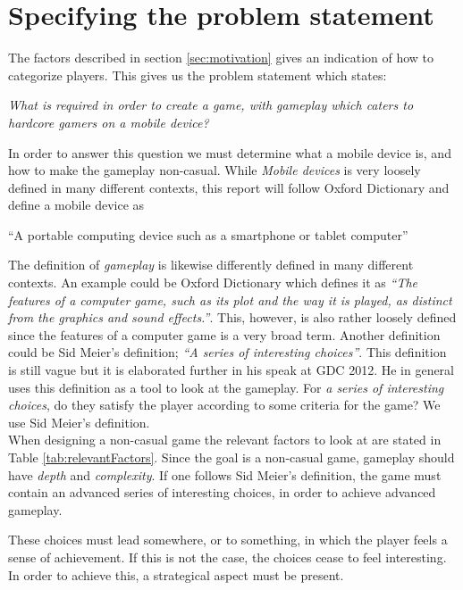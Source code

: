 \section{Specifying the problem statement}
\label{sec:specifyingtheproblemstatemen}

The factors described in section \ref{sec:motivation} gives an indication of how to categorize players.
This gives us the problem statement which states:
\begin{center}
\textit{What is required in order to create a game, with gameplay which caters to hardcore gamers on a mobile device?}
\end{center}

In order to answer this question we must determine what a mobile device is, and how to make the gameplay non-casual.
While \textit{Mobile devices} is very loosely defined in many different contexts, this report will follow Oxford Dictionary and define a mobile device as 
\begin{center}
``A portable computing device such as a smartphone or tablet computer''\cite{mobileOx}
\end{center}

The definition of \textit{gameplay} is likewise differently defined in many different contexts. 
An example could be Oxford Dictionary which defines it as \textit{``The features of a computer game, such as its plot and the way it is played, as distinct from the graphics and sound effects.''}\cite{gameplayOx}. This, however, is also rather loosely defined since the features of a computer game is a very broad term. 
Another definition could be Sid Meier's definition; \textit{``A series of interesting choices''}\cite{GDC2012}. 
This definition is still vague but it is elaborated further in his speak at GDC 2012.\cite{GDC2012}
He in general uses this definition as a tool to look at the gameplay.
For \textit{a series of interesting choices}, do they satisfy the player according to some criteria for the game?
We use Sid Meier's definition.\\

When designing a non-casual game the relevant factors to look at are stated in Table \ref{tab:relevantFactors}.
Since the goal is a non-casual game, gameplay should have \textit{depth} and \textit{complexity}.
If one follows Sid Meier's definition, the game must contain an advanced series of interesting choices, in order to achieve advanced gameplay.

These choices must lead somewhere, or to something, in which the player feels a sense of achievement. If this is not the case, the choices cease to feel interesting. In order to achieve this, a strategical aspect must be present.

